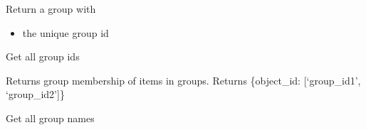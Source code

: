 \documentclass[letterpaper,10pt,english]{sphinxmanual}
\begin{document}
\begin{fulllineitems}
\begin{fulllineitems}
\begin{itemize}
\end{itemize}

\end{fulllineitems}


\begin{fulllineitems}
\label{\detokenize{modules_doc:cbmpy.CBModel.Model.getGroup}}
\pysigstartsignatures
{}
\pysigstopsignatures
\sphinxAtStartPar
Return a group with
\begin{itemize}
\item {} 
\sphinxAtStartPar
{} the unique group id

\end{itemize}

\end{fulllineitems}


\begin{fulllineitems}
\label{\detokenize{modules_doc:cbmpy.CBModel.Model.getGroupIds}}
\pysigstartsignatures
{}
\pysigstopsignatures
\sphinxAtStartPar
Get all group ids

\end{fulllineitems}


\begin{fulllineitems}
\label{\detokenize{modules_doc:cbmpy.CBModel.Model.getGroupMembership}}
\pysigstartsignatures
{}
\pysigstopsignatures
\sphinxAtStartPar
Returns group membership of items in groups. Returns \{object\_id: {[}‘group\_id1’, ‘group\_id2’{]}\}

\end{fulllineitems}


\begin{fulllineitems}
\label{\detokenize{modules_doc:cbmpy.CBModel.Model.getGroupNames}}
\pysigstartsignatures
{}
\pysigstopsignatures
\sphinxAtStartPar
Get all group names


\end{fulllineitems}
\end{fulllineitems}
\end{document}
